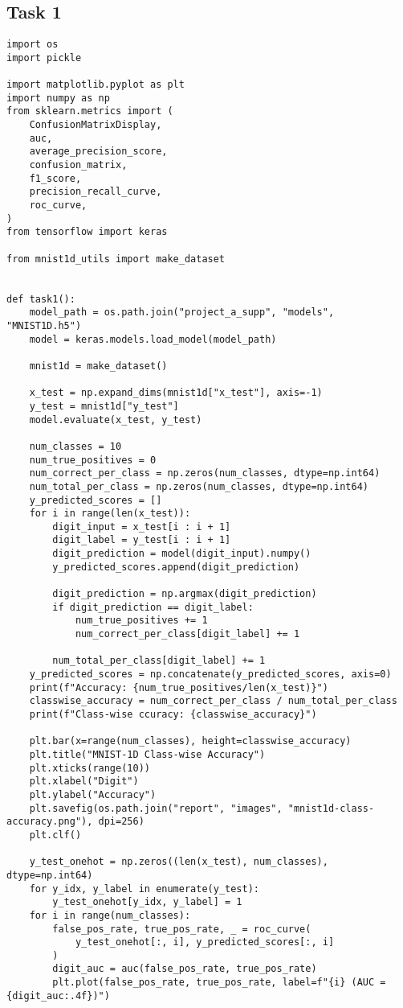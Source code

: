 \documentclass{article}
\begin{document}
\subsection{Task 1}
\label{sec:task1-listing}

\begin{lstlisting}
import os
import pickle

import matplotlib.pyplot as plt
import numpy as np
from sklearn.metrics import (
    ConfusionMatrixDisplay,
    auc,
    average_precision_score,
    confusion_matrix,
    f1_score,
    precision_recall_curve,
    roc_curve,
)
from tensorflow import keras

from mnist1d_utils import make_dataset


def task1():
    model_path = os.path.join("project_a_supp", "models", "MNIST1D.h5")
    model = keras.models.load_model(model_path)

    mnist1d = make_dataset()

    x_test = np.expand_dims(mnist1d["x_test"], axis=-1)
    y_test = mnist1d["y_test"]
    model.evaluate(x_test, y_test)

    num_classes = 10
    num_true_positives = 0
    num_correct_per_class = np.zeros(num_classes, dtype=np.int64)
    num_total_per_class = np.zeros(num_classes, dtype=np.int64)
    y_predicted_scores = []
    for i in range(len(x_test)):
        digit_input = x_test[i : i + 1]
        digit_label = y_test[i : i + 1]
        digit_prediction = model(digit_input).numpy()
        y_predicted_scores.append(digit_prediction)

        digit_prediction = np.argmax(digit_prediction)
        if digit_prediction == digit_label:
            num_true_positives += 1
            num_correct_per_class[digit_label] += 1

        num_total_per_class[digit_label] += 1
    y_predicted_scores = np.concatenate(y_predicted_scores, axis=0)
    print(f"Accuracy: {num_true_positives/len(x_test)}")
    classwise_accuracy = num_correct_per_class / num_total_per_class
    print(f"Class-wise ccuracy: {classwise_accuracy}")

    plt.bar(x=range(num_classes), height=classwise_accuracy)
    plt.title("MNIST-1D Class-wise Accuracy")
    plt.xticks(range(10))
    plt.xlabel("Digit")
    plt.ylabel("Accuracy")
    plt.savefig(os.path.join("report", "images", "mnist1d-class-accuracy.png"), dpi=256)
    plt.clf()

    y_test_onehot = np.zeros((len(x_test), num_classes), dtype=np.int64)
    for y_idx, y_label in enumerate(y_test):
        y_test_onehot[y_idx, y_label] = 1
    for i in range(num_classes):
        false_pos_rate, true_pos_rate, _ = roc_curve(
            y_test_onehot[:, i], y_predicted_scores[:, i]
        )
        digit_auc = auc(false_pos_rate, true_pos_rate)
        plt.plot(false_pos_rate, true_pos_rate, label=f"{i} (AUC = {digit_auc:.4f})")


\end{lstlisting}
\end{document}

